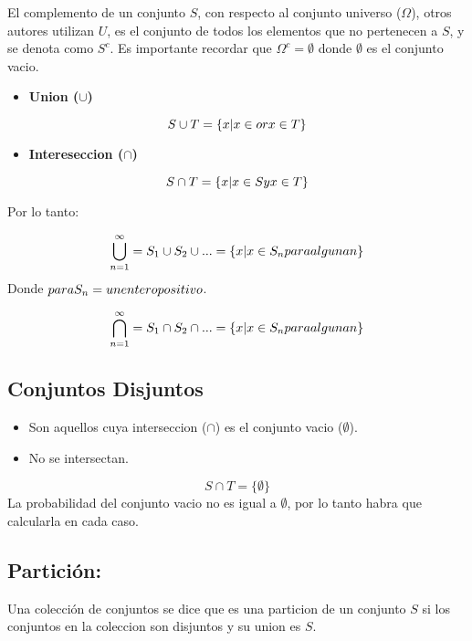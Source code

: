 \documentclass[]{book}
\providecommand{\tightlist}{%
  \setlength{\itemsep}{0pt}\setlength{\parskip}{0pt}}
\begin{document}
El complemento de un conjunto \(S\), con respecto al conjunto universo
(\(\Omega\)), otros autores utilizan \(U\), es el conjunto de todos los
elementos que no pertenecen a \(S\), y se denota como \(S^c\). Es
importante recordar que \(\Omega^c = \emptyset\) donde \(\emptyset\) es
el conjunto vacio.

\begin{itemize}
\tightlist
\item
  \textbf{Union (\(\cup\))}
\end{itemize}

\[S \cup T = \{x|x \in or\space x\in T\}\]

\begin{itemize}
\tightlist
\item
  \textbf{Intereseccion (\(\cap\))}
\end{itemize}

\[S \cap T = \{x|x \in S\space y \space x \in T \} \]

 Por lo tanto:

\[\bigcup_{n=1}^{\infty}= S_1 \cup S_2 \cup ...= \{ x|x \in S_n para \space alguna\space n\} \]
Donde \(para\space S_n = \space un \space entero \space positivo\).

\[ \bigcap_{n=1}^{\infty} = S_1 \cap S_2 \cap ... = \{ x|x \in S_n \space para \space alguna \space n\}\]

\subsection{Conjuntos Disjuntos}\label{conjuntos-disjuntos}

\begin{itemize}
\tightlist
\item
  Son aquellos cuya interseccion (\(\cap\)) es el conjunto vacio
  (\(\emptyset\)).
\item
  No se intersectan.
\end{itemize}

\[S \cap T = \{ \emptyset\}\] La probabilidad del conjunto vacio no es
igual a \(\emptyset\), por lo tanto habra que calcularla en cada caso.

\subsection{Partición:}\label{particion}

Una colección de conjuntos se dice que es una particion de un conjunto
\(S\) si los conjuntos en la coleccion son disjuntos y su union es
\(S\).
\end{document}
